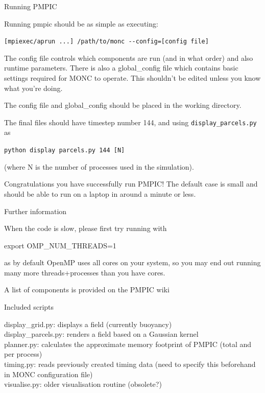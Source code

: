 \documentclass{beamer}
\newenvironment{Shaded}{}{}
\newcommand{\VariableTok}[1]{\textcolor[rgb]{0.00,0.00,0.00}{{#1}}}
\newcommand{\BuiltInTok}[1]{{#1}}
\newcommand{\NormalTok}[1]{{#1}}
\begin{document}
\begin{frame}[fragile]{Running PMPIC}
\protect\hypertarget{running-pmpic}{}

Running pmpic should be as simple as executing:

\texttt{{[}mpiexec/aprun\ ...{]}\ /path/to/monc\ -\/-config={[}config\ file{]}}

The config file controls which components are run (and in what order)
and also runtime parameters. There is also a global\_config file which
contains basic settings required for MONC to operate. This shouldn't be
edited unless you know what you're doing.

The config file and global\_config should be placed in the working
directory.

The final files should have timestep number 144, and using
\texttt{display\_parcels.py} as

\texttt{python\ display\ parcels.py\ 144\ {[}N{]}}

(where N is the number of processes used in the simulation).

Congratulations you have successfully run PMPIC! The default case is small and should be able to run on a laptop in around a minute or less.

\end{frame}

\begin{frame}[fragile]{Further information}
\protect\hypertarget{further information}{}

When the code is slow, please first try running with

\begin{Shaded}
\begin{Highlighting}[]
\BuiltInTok{export} \VariableTok{OMP_NUM_THREADS=}\NormalTok{1}
\end{Highlighting}
\end{Shaded}

as by default OpenMP uses all cores on your system, so you may end out
running many more threads+processes than you have cores.

A list of components is provided on the PMPIC wiki

\end{frame}

\begin{frame}{Included scripts}
\protect\hypertarget{included-scripts}{}

display\_grid.py: displays a field (currently buoyancy)\\
display\_parcels.py: renders a field based on a Gaussian kernel\\
planner.py: calculates the approximate memory footprint of PMPIC (total
and per process)\\
timing.py: reads previously created timing data (need to specify this
beforehand in MONC configuration file)\\
visualise.py: older visualisation routine (obsolete?)

\end{frame}
\end{document}
